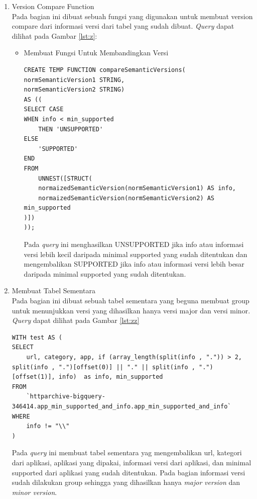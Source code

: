 \begin{enumerate}
	
	\item Version Compare Function\\
	Pada bagian ini dibuat sebuah fungsi yang digunakan untuk membuat version compare dari informasi versi dari tabel yang sudah dibuat. \textit{Query} dapat dilihat pada Gambar \ref{lst:z}:
	\begin{itemize}
		\item Membuat Fungsi Untuk Membandingkan Versi
		\begin{lstlisting}[label={lst:z}, caption={Fungsi Version Compare}]
CREATE TEMP FUNCTION compareSemanticVersions(
normSemanticVersion1 STRING, 
normSemanticVersion2 STRING) 
AS ((
SELECT CASE 
WHEN info < min_supported 
	THEN 'UNSUPPORTED'
ELSE 
	'SUPPORTED'
END
FROM 
	UNNEST([STRUCT(
	normaizedSemanticVersion(normSemanticVersion1) AS info, 
	normaizedSemanticVersion(normSemanticVersion2) AS min_supported
)])
));
		\end{lstlisting}
		Pada \textit{query} ini menghasilkan UNSUPPORTED jika info atau informasi versi lebih kecil daripada minimal supported yang sudah ditentukan dan mengembalikan SUPPORTED jika info atau informasi versi lebih besar daripada minimal supported yang sudah ditentukan.
	\end{itemize}
		

	\item Membuat Tabel Sementara\\
	Pada bagian ini dibuat sebuah tabel sementara yang beguna membuat group untuk menunjukkan versi yang dihasilkan hanya versi major dan versi minor. \textit{Query} dapat dilihat pada Gambar \ref{lst:zz}
	\begin{lstlisting}[label={lst:zz}, caption={Membuat Tabel Sementara}]
WITH test AS (
SELECT 
	url, category, app, if (array_length(split(info , ".")) > 2, split(info , ".")[offset(0)] || "." || split(info , ".")[offset(1)], info)  as info, min_supported	
FROM
	`httparchive-bigquery-346414.app_min_supported_and_info.app_min_supported_and_info`
WHERE 
	info != "\\"
)
	\end{lstlisting}
	Pada \textit{query} ini membuat tabel sementara yag mengembalikan url, kategori dari aplikasi, aplikasi yang dipakai, informasi versi dari aplikasi, dan minimal supported dari aplikasi yang sudah ditentukan. Pada bagian informasi versi sudah dilakukan group sehingga yang dihasilkan hanya \textit{major} \textit{version} dan \textit{minor version}. 
	

\end{enumerate}
